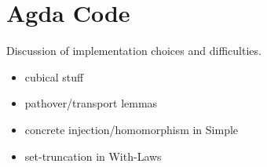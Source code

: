 \section{Agda Code}

Discussion of implementation choices and difficulties.

\begin{itemize}
\item cubical stuff
\item pathover/transport lemmas
\item concrete injection/homomorphism in Simple
\item set-truncation in With-Laws
\end{itemize}